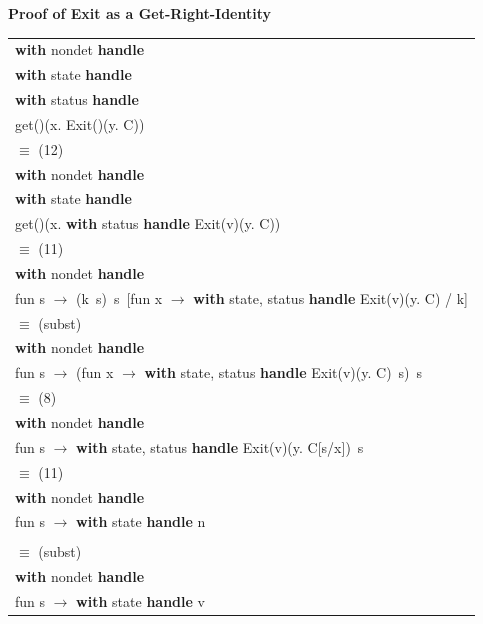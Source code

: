 \documentclass[logo,bsc,singlespacing,parskip]{infthesis}
\begin{document}
\vspace{1em}
{\large{\textbf{Proof of Exit as a Get-Right-Identity}}}

\normalsize



\begin{longtable}{@{}l@{}}
\textbf{with } nondet \textbf{ handle} \\
\quad \textbf{with } state \textbf{ handle} \\
\quad\quad \textbf{with } status \textbf{ handle} \\
\quad\quad\quad get()(x. Exit()(y. C)) \\

\quad$\equiv$ (12) \\
\textbf{with } nondet \textbf{ handle} \\
\quad \textbf{with } state \textbf{ handle} \\
\quad\quad get()(x. \textbf{with } status \textbf{ handle } Exit(v)(y. C)) \\

\quad$\equiv$ (11) \\
\textbf{with } nondet \textbf{ handle} \\
\quad fun s $\rightarrow$ (k\ s)\ s\ [fun x $\rightarrow$ \textbf{with } state, status \textbf{ handle } Exit(v)(y. C) / k] \\

\quad$\equiv$ (subst) \\
\textbf{with } nondet \textbf{ handle} \\
\quad fun s $\rightarrow$ (fun x $\rightarrow$ \textbf{with } state, status \textbf{ handle } Exit(v)(y. C)\ s)\ s \\

\quad$\equiv$ (8) \\
\textbf{with } nondet \textbf{ handle} \\
\quad fun s $\rightarrow$ \textbf{with } state, status \textbf{ handle } Exit(v)(y. C[s/x])\ s \\

\quad$\equiv$ (11) \\
\textbf{with } nondet \textbf{ handle} \\
\quad fun s $\rightarrow$ \textbf{with } state \textbf{ handle } n \\
\quad{} 
\\ \quad$\equiv$ (subst) \\
\textbf{with } nondet \textbf{ handle} \\
\quad fun s $\rightarrow$ \textbf{with } state \textbf{ handle } v \\
\end{longtable}
\end{document}
